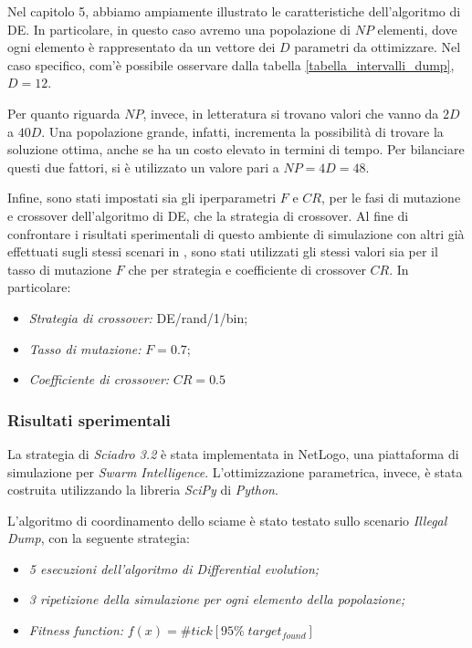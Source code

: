 Nel capitolo 5, abbiamo ampiamente illustrato le caratteristiche dell'algoritmo di DE.
In particolare, in questo caso avremo una popolazione di $NP$ elementi, dove ogni elemento è rappresentato da un vettore dei $D$ parametri da ottimizzare.
Nel caso specifico, com'è possibile osservare dalla tabella \ref{tabella_intervalli_dump}, $D=12$.

Per quanto riguarda $NP$, invece, in letteratura si trovano valori che vanno da $2D$ a $40D$.
Una popolazione grande, infatti, incrementa la possibilità di trovare la soluzione ottima, anche se ha un costo elevato in termini di tempo.
Per bilanciare questi due fattori, si è utilizzato un valore pari a $NP = 4D = 48$.

Infine, sono stati impostati sia gli iperparametri $F$ e $CR$, per le fasi di mutazione e crossover dell'algoritmo di DE, che la strategia di crossover.
Al fine di confrontare i risultati sperimentali di questo ambiente di simulazione con altri già effettuati sugli stessi scenari in \cite{cimino2019adaptive}, sono stati utilizzati gli stessi valori sia per il tasso di mutazione $F$ che per strategia e coefficiente di crossover $CR$.
In particolare:
\begin{itemize}
    \item \textit{Strategia di crossover:} DE/rand/1/bin;
    \item \textit{Tasso di mutazione:} $F=0.7$;
    \item \textit{Coefficiente di crossover:} $CR=0.5$
\end{itemize}

\subsubsection{Risultati sperimentali}

La strategia di \textit{Sciadro 3.2} è stata implementata in NetLogo, una piattaforma di simulazione per \textit{Swarm Intelligence}.
L'ottimizzazione parametrica, invece, è stata costruita utilizzando la libreria \textit{SciPy} di \textit{Python}.

L'algoritmo di coordinamento dello sciame è stato testato sullo scenario \textit{Illegal Dump}, con la seguente strategia:
\begin{itemize}
    \item \textit{5 esecuzioni dell'algoritmo di Differential evolution;}
    \item \textit{3 ripetizione della simulazione per ogni elemento della popolazione;}
    \item \textit{Fitness function:} $f(x) = \# tick[95 \% \; target_{found}]$
\end{itemize}

